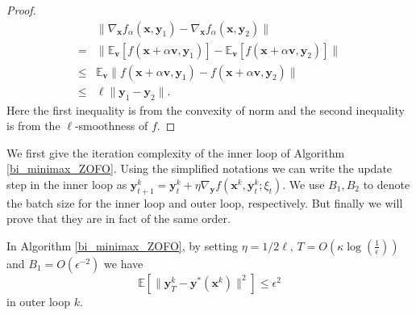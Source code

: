 \begin{proof}
    \begin{align*}
        & \|\nabla_{ \mathbf{x}} f_\alpha({ \mathbf{x}},{ \mathbf{y}}_1)-\nabla_{ \mathbf{x}} f_\alpha({ \mathbf{x}},{ \mathbf{y}}_2)\| \\
        = & \|\mathbb{E}_{ \mathbf{v}} [ f({ \mathbf{x}}+\alpha { \mathbf{v}},{ \mathbf{y}}_1) ]-\mathbb{E}_{ \mathbf{v}} [ f({ \mathbf{x}}+\alpha { \mathbf{v}},{ \mathbf{y}}_2) ]\| \\
        \leq & \mathbb{E}_{ \mathbf{v}}\|f({ \mathbf{x}}+\alpha { \mathbf{v}},{ \mathbf{y}}_1)-f({ \mathbf{x}}+\alpha { \mathbf{v}},{ \mathbf{y}}_2)\| \\
        \leq & \ell\|{ \mathbf{y}}_1-{ \mathbf{y}}_2\|.
    \end{align*}
    Here the first inequality is from the convexity of norm and the second inequality is from the $\ell$-smoothness of $f$.
\end{proof}

We first give the iteration complexity of the inner loop of Algorithm \ref{bi_minimax_ZOFO}. Using the simplified notations we can write the update step in the inner loop as ${ \mathbf{y}}^k_{t+1}={ \mathbf{y}}^k_t+\eta \nabla_{ \mathbf{y}} f({ \mathbf{x}}^k,{ \mathbf{y}}^k_t;\xi_t).$ We use $B_1, B_2$ to denote the batch size for the inner loop and outer loop, respectively. But finally we will prove that they are in fact of the same order.

\begin{lemma}
\label{lemma7}
    In Algorithm \ref{bi_minimax_ZOFO}, by setting $\eta=1/2\ell$, $T=O(\kappa\log(\frac{1}{\epsilon}))$ and $B_1=O(\epsilon^{-2})$ we have $$\mathbb{E}[\|{ \mathbf{y}}^k_{T}-{ \mathbf{y}}^*({ \mathbf{x}}^k)\|^2]\leq \epsilon^2$$ in outer loop $k$.
\end{lemma}

